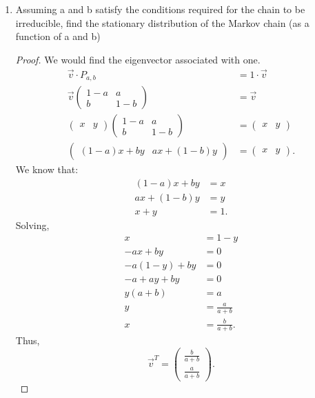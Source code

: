 \documentclass[a4paper]{article}
\begin{document}
\begin{enumerate}
\begin{enumerate}
  \item Assuming a and b satisfy the conditions required for the chain to be irreducible, find the stationary distribution of the Markov chain (as a function of a and b)
\begin{proof}
  We would find the eigenvector associated with one. 
  \begin{align*}
    \vec{v} \cdot P_{a,b} &= 1 \cdot \vec{v} \\
    \vec{v}  \begin{pmatrix} 1 -a &  a \\ b & 1 - b \end{pmatrix} &=  \vec{v} \\
    \begin{pmatrix} x & y \end{pmatrix}  \begin{pmatrix} 1 -a &  a \\ b & 1 - b \end{pmatrix} &=  \begin{pmatrix} x & y \end{pmatrix}  \\
    \begin{pmatrix} (1-a) x + b y & ax + (1-b) y \end{pmatrix}  &= \begin{pmatrix} x & y \end{pmatrix}   
  .\end{align*}
  We know that:
  \begin{align*}
    (1-a)x + by &= x \\
    ax + (1-b)y &= y \\
    x + y &= 1
  .\end{align*}
  Solving,
  \begin{align}
    x &= 1 - y \\
    -ax + by &= 0 \\
    -a(1-y) + by &= 0 \\
    -a +ay + by &= 0 \\
    y(a+b) &= a \\
    y &= \frac{a}{a+b} \\
    x &= \frac{b}{a+b}
  .\end{align}
  Thus,
  \[
    \vec{v}^{T} = \begin{pmatrix} \frac{b}{a+b} \\ \frac{a}{a+b} \end{pmatrix} 
  .\] 
\end{proof}
\end{enumerate}
  

\end{enumerate}
\end{document}

